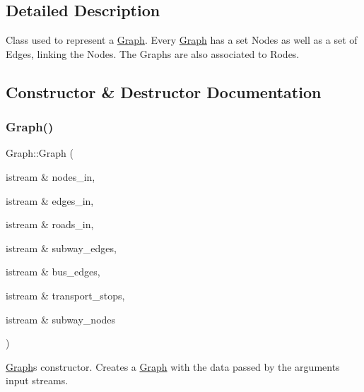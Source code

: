 \subsection{Detailed Description}
Class used to represent a \hyperlink{class_graph}{Graph}. Every \hyperlink{class_graph}{Graph} has a set Nodes as well as a set of Edges, linking the Nodes. The Graphs are also associated to Rodes. 

\subsection{Constructor \& Destructor Documentation}
\hypertarget{class_graph_ae183fb1b13b88958a01c626ca35b004a}{}\label{class_graph_ae183fb1b13b88958a01c626ca35b004a} 
\subsubsection{\texorpdfstring{Graph()}{Graph()}\hspace{0.1cm}{\footnotesize\ttfamily [1/2]}}
{\footnotesize\ttfamily Graph\+::\+Graph (\begin{DoxyParamCaption}\item[{istream \&}]{nodes\+\_\+in,  }\item[{istream \&}]{edges\+\_\+in,  }\item[{istream \&}]{roads\+\_\+in,  }\item[{istream \&}]{subway\+\_\+edges,  }\item[{istream \&}]{bus\+\_\+edges,  }\item[{istream \&}]{transport\+\_\+stops,  }\item[{istream \&}]{subway\+\_\+nodes }\end{DoxyParamCaption})}

\hyperlink{class_graph}{Graph}\textquotesingle{}s constructor. Creates a \hyperlink{class_graph}{Graph} with the data passed by the arguments input streams.


